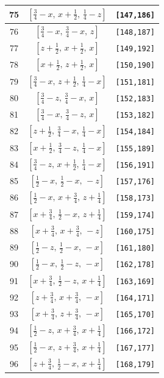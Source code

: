 \documentclass[fleqn,8pt]{jsarticle}
\begin{document}
\begin{longtable}{ccc}
75 & $\left[ \frac{3}{4} - x,\, x + \frac{1}{2},\, \frac{1}{4} - z \right]$ & {\tt [147,186]} \\ \hline
76 & $\left[ \frac{3}{4} - x,\, \frac{3}{4} - x,\, z \right]$ & {\tt [148,187]} \\ \hline
77 & $\left[ z + \frac{1}{2},\, x + \frac{1}{2},\, x \right]$ & {\tt [149,192]} \\ \hline
78 & $\left[ x + \frac{1}{2},\, z + \frac{1}{2},\, x \right]$ & {\tt [150,190]} \\ \hline
79 & $\left[ \frac{3}{4} - x,\, z + \frac{1}{2},\, \frac{1}{4} - x \right]$ & {\tt [151,181]} \\ \hline
80 & $\left[ \frac{3}{4} - z,\, \frac{3}{4} - x,\, x \right]$ & {\tt [152,183]} \\ \hline
81 & $\left[ \frac{3}{4} - x,\, \frac{3}{4} - z,\, x \right]$ & {\tt [153,182]} \\ \hline
82 & $\left[ z + \frac{1}{2},\, \frac{3}{4} - x,\, \frac{1}{4} - x \right]$ & {\tt [154,184]} \\ \hline
83 & $\left[ x + \frac{1}{2},\, \frac{3}{4} - z,\, \frac{1}{4} - x \right]$ & {\tt [155,189]} \\ \hline
84 & $\left[ \frac{3}{4} - z,\, x + \frac{1}{2},\, \frac{1}{4} - x \right]$ & {\tt [156,191]} \\ \hline
85 & $\left[ \frac{1}{2} - x,\, \frac{1}{2} - x,\, - z \right]$ & {\tt [157,176]} \\ \hline
86 & $\left[ \frac{1}{2} - x,\, x + \frac{3}{4},\, z + \frac{1}{4} \right]$ & {\tt [158,173]} \\ \hline
87 & $\left[ x + \frac{3}{4},\, \frac{1}{2} - x,\, z + \frac{1}{4} \right]$ & {\tt [159,174]} \\ \hline
88 & $\left[ x + \frac{3}{4},\, x + \frac{3}{4},\, - z \right]$ & {\tt [160,175]} \\ \hline
89 & $\left[ \frac{1}{2} - z,\, \frac{1}{2} - x,\, - x \right]$ & {\tt [161,180]} \\ \hline
90 & $\left[ \frac{1}{2} - x,\, \frac{1}{2} - z,\, - x \right]$ & {\tt [162,178]} \\ \hline
91 & $\left[ x + \frac{3}{4},\, \frac{1}{2} - z,\, x + \frac{1}{4} \right]$ & {\tt [163,169]} \\ \hline
92 & $\left[ z + \frac{3}{4},\, x + \frac{3}{4},\, - x \right]$ & {\tt [164,171]} \\ \hline
93 & $\left[ x + \frac{3}{4},\, z + \frac{3}{4},\, - x \right]$ & {\tt [165,170]} \\ \hline
94 & $\left[ \frac{1}{2} - z,\, x + \frac{3}{4},\, x + \frac{1}{4} \right]$ & {\tt [166,172]} \\ \hline
95 & $\left[ \frac{1}{2} - x,\, z + \frac{3}{4},\, x + \frac{1}{4} \right]$ & {\tt [167,177]} \\ \hline
96 & $\left[ z + \frac{3}{4},\, \frac{1}{2} - x,\, x + \frac{1}{4} \right]$ & {\tt [168,179]} \\
\end{longtable}
\end{document}
